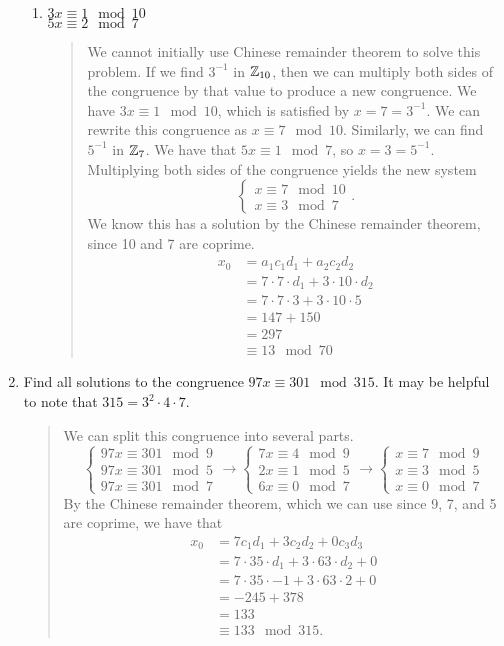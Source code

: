 \documentclass{hw}
\begin{document}
\begin{enumerate}
\begin{enumerate}
\item $3x\equiv1\mod10$\\
$5x\equiv2\mod7$
\begin{quote}
We cannot initially use Chinese remainder theorem to solve this problem. If we find $3^{-1}$ in
$\mathbb{Z}_{10}$, then we can multiply both sides of the congruence by that value to produce a new
congruence. We have $3x\equiv1\mod10$, which is satisfied by $x=7=3^{-1}$. We can rewrite this
congruence as $x\equiv7\mod10$. Similarly, we can find $5^{-1}$ in $\mathbb{Z}_{7}$. We have that
$5x\equiv1\mod7$, so $x=3=5^{-1}$. Multiplying both sides of the congruence yields the new system
\[
\begin{cases}
x\equiv7\mod10\\
x\equiv3\mod7
\end{cases}.
\]
We know this has a solution by the Chinese remainder theorem, since 10 and 7 are coprime.
\begin{align*}
x_{0}&=a_{1}c_{1}d_{1}+a_{2}c_{2}d_{2}\\
&=7\cdot7\cdot d_{1}+3\cdot10\cdot d_{2}\\
&=7\cdot7\cdot3+3\cdot10\cdot5\\
&=147+150\\
&=297\\
&\equiv13\mod70
\end{align*}
\end{quote}
\end{enumerate}

\item Find all solutions to the congruence $97x\equiv301\mod315$. It may be helpful to note that
$315=3^{2}\cdot4\cdot7$.
\begin{quote}
We can split this congruence into several parts.
\[
\begin{cases}
97x\equiv301\mod9\\
97x\equiv301\mod5\\
97x\equiv301\mod7
\end{cases}
\to
\begin{cases}
7x\equiv4\mod9\\
2x\equiv1\mod5\\
6x\equiv0\mod7
\end{cases}
\to
\begin{cases}
x\equiv7\mod9\\
x\equiv3\mod5\\
x\equiv0\mod7
\end{cases}
\]
By the Chinese remainder theorem, which we can use since 9, 7, and 5 are coprime, we have that
\begin{align*}
x_{0}&=7c_{1}d_{1}+3c_{2}d_{2}+0c_{3}d_{3}\\
&=7\cdot35\cdot d_{1}+3\cdot63\cdot d_{2} + 0\\
&=7\cdot35\cdot -1+3\cdot63\cdot 2 + 0\\
&=-245+378\\
&=133\\
&\equiv133\mod315.
\end{align*}
\end{quote}


\end{enumerate}
\end{document}
